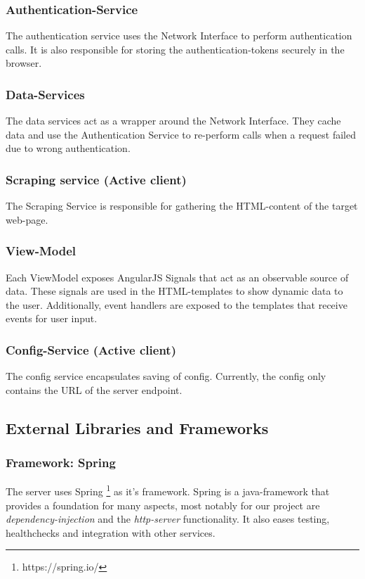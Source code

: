 \subsubsection{Authentication-Service}
The authentication service uses the Network Interface to perform authentication calls.
It is also responsible for storing the authentication-tokens securely in the browser.

\subsubsection{Data-Services}
The data services act as a wrapper around the Network Interface.
They cache data and use the Authentication Service to re-perform calls when a request failed due to wrong authentication.

\subsubsection{Scraping service (Active client)}
The Scraping Service is responsible for gathering the HTML-content of the target web-page.

\subsubsection{View-Model}
Each ViewModel exposes AngularJS Signals that act as an observable source of data.
These signals are used in the HTML-templates to show dynamic data to the user. \newline
Additionally, event handlers are exposed to the templates that receive events for user input.

\subsubsection{Config-Service (Active client)}
The config service encapsulates saving of config. \newline
Currently, the config only contains the URL of the server endpoint.

\subsection{External Libraries and Frameworks}\label{subsec:external-libraries-and-frameworks}
\subsubsection{Framework: Spring}
The server uses Spring \footnote{https://spring.io/} as it's framework.
Spring is a java-framework that provides a foundation for many aspects, most notably for our project are \textit{dependency-injection} and the \textit{http-server} functionality.
It also eases testing, healthchecks and integration with other services.


